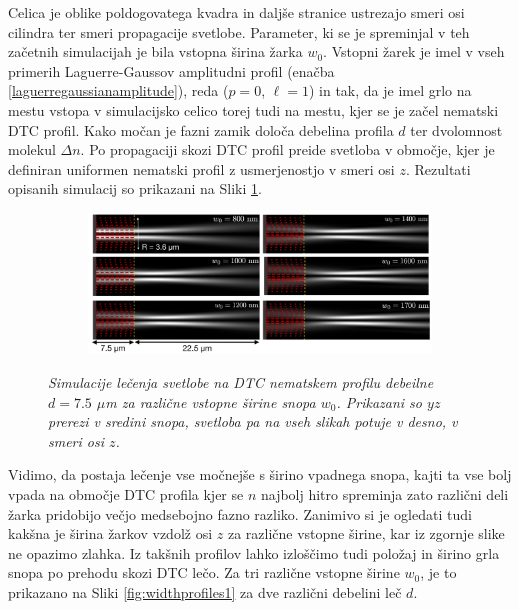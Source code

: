 \documentclass[longbibliography,slovene,a4paper,12pt]{book}
\begin{document}
Celica je oblike poldogovatega kvadra in daljše stranice ustrezajo smeri osi cilindra ter smeri propagacije svetlobe. Parameter, ki se je spreminjal v teh začetnih simulacijah je bila vstopna širina žarka $w_0$.  Vstopni žarek je imel v vseh primerih Laguerre-Gaussov amplitudni profil (enačba \ref{laguerregaussianamplitude}), reda ($p=0$, $\ell = 1$) in tak, da je imel grlo na mestu vstopa v simulacijsko celico torej tudi na mestu, kjer se je začel nematski DTC profil. Kako močan je fazni zamik določa debelina profila $d$ ter dvolomnost molekul $\Delta n$. Po propagaciji skozi DTC profil preide svetloba v območje, kjer je definiran uniformen nematski profil z usmerjenostjo v smeri osi $z$. Rezultati opisanih simulacij so prikazani na Sliki \ref{fig:lensingresults1}.

\begin{figure}[h!]
	\centering
	\begin{subfigure}[b]{1\textwidth}
	\includegraphics[width=\textwidth]{slike/lensing_31_5.png}
	\end{subfigure}
	\caption{\emph{Simulacije lečenja svetlobe na DTC nematskem profilu debeilne $ d = 7.5$ $\mu$m za različne vstopne širine snopa $w_0$. Prikazani so $yz$ prerezi v sredini snopa, svetloba pa na vseh slikah potuje v desno, v smeri osi $z$.}}
	\label{fig:lensingresults1}
\end{figure}

Vidimo, da postaja lečenje vse močnejše s širino vpadnega snopa, kajti ta vse bolj vpada na območje DTC profila kjer se $n$ najbolj hitro spreminja zato različni deli žarka pridobijo večjo medsebojno fazno razliko. Zanimivo si je ogledati tudi kakšna je širina žarkov vzdolž osi $z$ za različne vstopne širine, kar iz zgornje slike ne opazimo zlahka. Iz takšnih profilov lahko izloščimo tudi položaj in širino grla snopa po prehodu skozi DTC lečo. Za tri različne vstopne širine $w_0$, je to prikazano na Sliki \ref{fig:widthprofiles1} za dve različni debelini leč $d$. 
\end{document}
